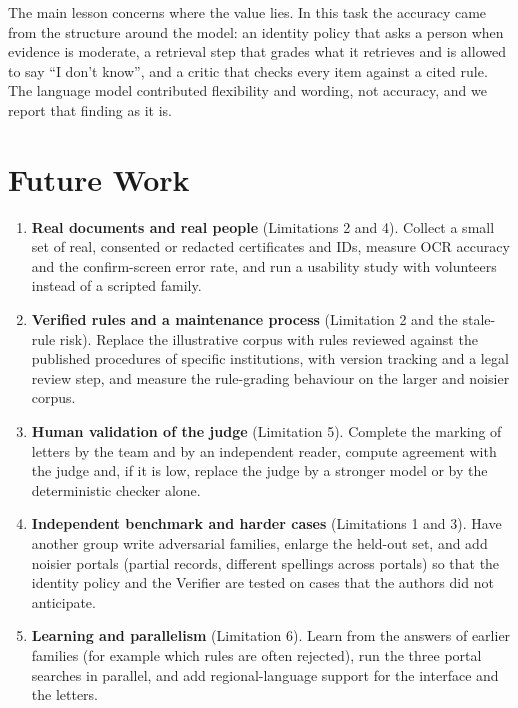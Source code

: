 The main lesson concerns where the value lies. In this task the accuracy came from the structure around the model: an identity policy that asks a person when evidence is moderate, a retrieval step that grades what it retrieves and is allowed to say ``I don't know'', and a critic that checks every item against a cited rule. The language model contributed flexibility and wording, not accuracy, and we report that finding as it is.

\section{Future Work}
\begin{enumerate}[leftmargin=*,itemsep=3pt]
\item \textbf{Real documents and real people} (Limitations 2 and 4). Collect a small set of real, consented or redacted certificates and IDs, measure OCR accuracy and the confirm-screen error rate, and run a usability study with volunteers instead of a scripted family.
\item \textbf{Verified rules and a maintenance process} (Limitation 2 and the stale-rule risk). Replace the illustrative corpus with rules reviewed against the published procedures of specific institutions, with version tracking and a legal review step, and measure the rule-grading behaviour on the larger and noisier corpus.
\item \textbf{Human validation of the judge} (Limitation 5). Complete the marking of letters by the team and by an independent reader, compute agreement with the judge and, if it is low, replace the judge by a stronger model or by the deterministic checker alone.
\item \textbf{Independent benchmark and harder cases} (Limitations 1 and 3). Have another group write adversarial families, enlarge the held-out set, and add noisier portals (partial records, different spellings across portals) so that the identity policy and the Verifier are tested on cases that the authors did not anticipate.
\item \textbf{Learning and parallelism} (Limitation 6). Learn from the answers of earlier families (for example which rules are often rejected), run the three portal searches in parallel, and add regional-language support for the interface and the letters.
\end{enumerate}
